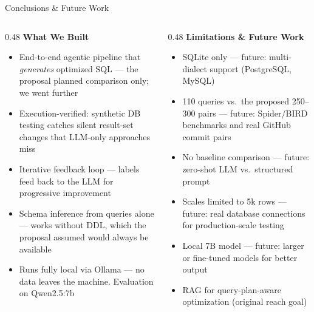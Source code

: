 \documentclass[10pt,aspectratio=169]{beamer}
\newcommand{\Raleway}{\sffamily}
\begin{document}
\begin{frame}{Conclusions \& Future Work}
  \begin{columns}[T]

    \begin{column}{0.48\textwidth}
      {\small\Raleway\bfseries\color{aggieblue} What We Built}\\[0.4em]
      \footnotesize
      \begin{itemize}
        \setlength{\itemsep}{0.35em}
        \item End-to-end agentic pipeline that \textit{generates} optimized SQL --- the proposal planned comparison only; we went further
        \item Execution-verified: synthetic DB testing catches silent result-set changes that LLM-only approaches miss
        \item Iterative feedback loop --- labels feed back to the LLM for progressive improvement
        \item Schema inference from queries alone --- works without DDL, which the proposal assumed would always be available
        \item Runs fully local via Ollama --- no data leaves the machine. Evaluation on Qwen2.5:7b
      \end{itemize}
    \end{column}

    \begin{column}{0.48\textwidth}
      {\small\Raleway\bfseries\color{aggieblue} Limitations \& Future Work}\\[0.4em]
      \footnotesize
      \begin{itemize}
        \setlength{\itemsep}{0.35em}
        \item SQLite only --- future: multi-dialect support (PostgreSQL, MySQL)
        \item 110 queries vs.\ the proposed 250--300 pairs --- future: Spider/BIRD benchmarks and real GitHub commit pairs
        \item No baseline comparison --- future: zero-shot LLM vs.\ structured prompt
        \item Scales limited to 5k rows --- future: real database connections for production-scale testing
        \item Local 7B model --- future: larger or fine-tuned models for better output
        \item RAG for query-plan-aware optimization (original reach goal)
      \end{itemize}
    \end{column}

  \end{columns}
\end{frame}
\end{document}
